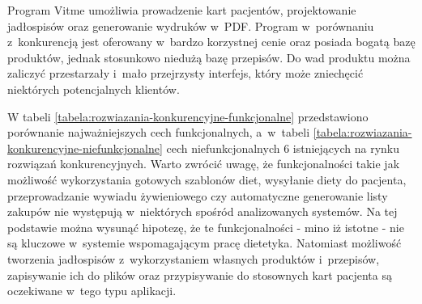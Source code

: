 \begin{itemize}
        Program Vitme\cite{url:vitme} umożliwia prowadzenie kart pacjentów, projektowanie jadłospisów oraz generowanie wydruków w~PDF.
        Program w~porównaniu z~konkurencją jest oferowany w~bardzo korzystnej cenie oraz posiada bogatą bazę produktów, jednak stosunkowo niedużą bazę przepisów.
        Do wad produktu można zaliczyć przestarzały i~mało przejrzysty interfejs, który może zniechęcić niektórych potencjalnych klientów.
%
\end{itemize}

W tabeli \ref{tabela:rozwiazania-konkurencyjne-funkcjonalne} przedstawiono porównanie najważniejszych cech funkcjonalnych,
a~w~tabeli \ref{tabela:rozwiazania-konkurencyjne-niefunkcjonalne} cech niefunkcjonalnych
6 istniejących na rynku rozwiązań konkurencyjnych\cite{url:porownanie-programow-dietetycznych}.
Warto zwrócić uwagę, że funkcjonalności takie jak możliwość wykorzystania gotowych szablonów diet, wysyłanie diety do pacjenta,
przeprowadzanie wywiadu żywieniowego czy automatyczne generowanie listy zakupów nie występują w~niektórych spośród analizowanych systemów.
Na tej podstawie można wysunąć hipotezę, że te funkcjonalności - mino iż istotne - nie są kluczowe w~systemie wspomagającym pracę dietetyka.
Natomiast możliwość tworzenia jadłospisów z~wykorzystaniem własnych produktów i~przepisów,
zapisywanie ich do plików oraz przypisywanie do stosownych kart pacjenta są oczekiwane w~tego typu aplikacji.

